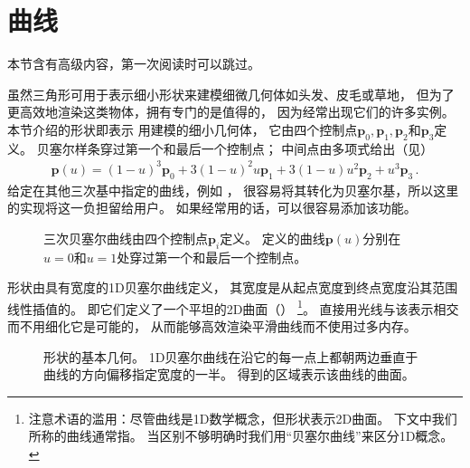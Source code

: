 \section{曲线}\label{sec:曲线}
\begin{remark}
    本节含有高级内容，第一次阅读时可以跳过。
\end{remark}

虽然三角形可用于表示细小形状来建模细微几何体如头发、皮毛或草地，
但为了更高效地渲染这类物体，拥有专门的是值得的，
因为经常出现它们的许多实例。
本节介绍的形状即表示
用建模的细小几何体，
它由四个控制点$\bm p_0,\bm p_1,\bm p_2$和$\bm p_3$定义。
贝塞尔样条穿过第一个和最后一个控制点；
中间点由多项式给出（见）
\begin{align}\label{eq:3.3}
    \bm p(u)=(1-u)^3\bm p_0+3(1-u)^2u\bm p_1+3(1-u)u^2\bm p_2+u^3\bm p_3\, .
\end{align}
给定在其他三次基中指定的曲线，例如
，
很容易将其转化为贝塞尔基，所以这里的实现将这一负担留给用户。
如果经常用的话，可以很容易添加该功能。
\begin{figure}[htbp]
    \centering
    \caption{三次贝塞尔曲线由四个控制点$\bm p_i$定义。
        \protect{}定义的曲线$\bm p(u)$分别在$u=0$和$u=1$处穿过第一个和最后一个控制点。}
    \label{fig:3.15}
\end{figure}

形状由具有宽度的1D贝塞尔曲线定义，
其宽度是从起点宽度到终点宽度沿其范围线性插值的。
即它们定义了一个平坦的2D曲面（）
\footnote{注意术语的滥用：尽管曲线是1D数学概念，但\protect{}形状表示2D曲面。
    下文中我们所称的曲线通常指\protect{}。
    当区别不够明确时我们用“贝塞尔曲线”来区分1D概念。}。
直接用光线与该表示相交而不用细化它是可能的，
从而能够高效渲染平滑曲线而不使用过多内存。
\begin{figure}[htbp]
    \centering
    \caption{\protect{}形状的基本几何。
        1D贝塞尔曲线在沿它的每一点上都朝两边垂直于曲线的方向偏移指定宽度的一半。
        得到的区域表示该曲线的曲面。}
    \label{fig:3.16}
\end{figure}

